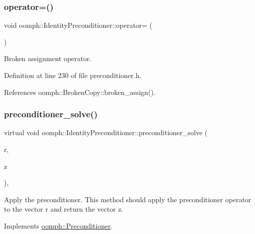 \subsubsection{\texorpdfstring{operator=()}{operator=()}}
{\footnotesize\ttfamily void oomph\+::\+Identity\+Preconditioner\+::operator= (\begin{DoxyParamCaption}\item[{const \hyperlink{classoomph_1_1IdentityPreconditioner}{Identity\+Preconditioner} \&}]{ }\end{DoxyParamCaption})\hspace{0.3cm}{\ttfamily [inline]}}



Broken assignment operator. 



Definition at line 230 of file preconditioner.\+h.



References oomph\+::\+Broken\+Copy\+::broken\+\_\+assign().

\mbox{\label{classoomph_1_1IdentityPreconditioner_a8daf11465066158a258b5996984490af}} 
\subsubsection{\texorpdfstring{preconditioner\+\_\+solve()}{preconditioner\_solve()}}
{\footnotesize\ttfamily virtual void oomph\+::\+Identity\+Preconditioner\+::preconditioner\+\_\+solve (\begin{DoxyParamCaption}\item[{const \hyperlink{classoomph_1_1DoubleVector}{Double\+Vector} \&}]{r,  }\item[{\hyperlink{classoomph_1_1DoubleVector}{Double\+Vector} \&}]{z }\end{DoxyParamCaption})\hspace{0.3cm}{\ttfamily [inline]}, {\ttfamily [virtual]}}



Apply the preconditioner. This method should apply the preconditioner operator to the vector r and return the vector z. 



Implements \hyperlink{classoomph_1_1Preconditioner_ace1199369e4465cd2b9a34884bb64ec8}{oomph\+::\+Preconditioner}.



